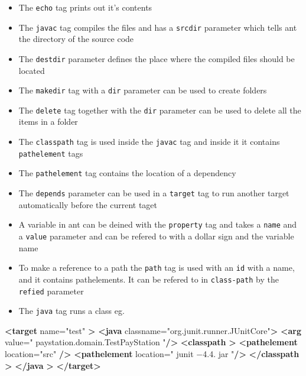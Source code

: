 \documentclass[11pt]{article}
\newenvironment{Shaded}{}{}
\newcommand{\KeywordTok}[1]{\textcolor[rgb]{0.00,0.44,0.13}{\textbf{{#1}}}}
\newcommand{\StringTok}[1]{\textcolor[rgb]{0.25,0.44,0.63}{{#1}}}
\newcommand{\OtherTok}[1]{\textcolor[rgb]{0.00,0.44,0.13}{{#1}}}
\begin{document}
\begin{itemize}
\item
  The \texttt{echo} tag prints out it's contents
\item
  The \texttt{javac} tag compiles the files and has a \texttt{srcdir}
  parameter which tells ant the directory of the source code
\item
  The \texttt{destdir} parameter defines the place where the compiled
  files should be located
\item
  The \texttt{makedir} tag with a \texttt{dir} parameter can be used to
  create folders
\item
  The \texttt{delete} tag together with the \texttt{dir} parameter can
  be used to delete all the items in a folder
\item
  The \texttt{classpath} tag is used inside the \texttt{javac} tag and
  inside it it contains \texttt{pathelement} tags
\item
  The \texttt{pathelement} tag contains the location of a dependency
\item
  The \texttt{depends} parameter can be used in a \texttt{target} tag to
  run another target automatically before the current taget
\item
  A variable in ant can be deined with the \texttt{property} tag and
  takes a \texttt{name} and a \texttt{value} parameter and can be
  refered to with a dollar sign and the variable name
\item
  To make a reference to a path the \texttt{path} tag is used with an
  \texttt{id} with a name, and it contains pathelements. It can be
  refered to in \texttt{class-path} by the \texttt{refied} parameter
\item
  The \texttt{java} tag runs a class eg.
\end{itemize}

\begin{Shaded}
\begin{Highlighting}[]
\KeywordTok{<target}\OtherTok{ name=}\StringTok{"test"} \KeywordTok{>}
    \KeywordTok{<java}\OtherTok{ classname=}\StringTok{"org.junit.runner.JUnitCore"}\KeywordTok{>}
        \KeywordTok{<arg}\OtherTok{ value=}\StringTok{" paystation.domain.TestPayStation "}\KeywordTok{/>}
        \KeywordTok{<classpath} \KeywordTok{>}
            \KeywordTok{<pathelement}\OtherTok{ location=}\StringTok{"src"} \KeywordTok{/>}
            \KeywordTok{<pathelement}\OtherTok{ location=}\StringTok{" junit −4.4. jar "}\KeywordTok{/>} 
        \KeywordTok{</classpath} \KeywordTok{>}
    \KeywordTok{</java} \KeywordTok{>} 
\KeywordTok{</target>}
\end{Highlighting}
\end{Shaded}
\end{document}
